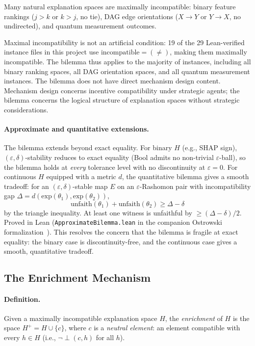 \documentclass[11pt,a4paper]{article}
\newcommand{\incomp}{\perp}
\begin{document}
Many natural explanation spaces are maximally incompatible: binary
feature rankings ($j > k$ or $k > j$, no tie), DAG edge orientations
($X \to Y$ or $Y \to X$, no undirected), and quantum measurement
outcomes.

Maximal incompatibility is not an artificial condition: 19 of the 29 Lean-verified instance files in this project use $\mathrm{incompatible} = (\neq)$, making them maximally incompatible.  The bilemma thus applies to the majority of instances, including all binary ranking spaces, all DAG orientation spaces, and all quantum measurement instances.
The bilemma does not have direct mechanism design content.  Mechanism design concerns incentive compatibility under strategic agents; the bilemma concerns the logical structure of explanation spaces without strategic considerations.

\paragraph{Approximate and quantitative extensions.}
The bilemma extends beyond exact equality. For binary $H$ (e.g., SHAP sign), $(\varepsilon, \delta)$-stability reduces to exact equality (Bool admits no non-trivial $\varepsilon$-ball), so the bilemma holds at \emph{every} tolerance level with no discontinuity at $\varepsilon = 0$. For continuous $H$ equipped with a metric $d$, the quantitative bilemma gives a smooth tradeoff: for an $(\varepsilon, \delta)$-stable map $E$ on an $\varepsilon$-Rashomon pair with incompatibility gap $\Delta = d(\text{exp}(\theta_1), \text{exp}(\theta_2))$,
$$\text{unfaith}(\theta_1) + \text{unfaith}(\theta_2) \geq \Delta - \delta$$
by the triangle inequality. At least one witness is unfaithful by $\geq (\Delta - \delta)/2$. Proved in Lean (\texttt{ApproximateBilemma.lean} in the companion Ostrowski formalization~\citep{caraker2026ostrowski}). This resolves the concern that the bilemma is fragile at exact equality: the binary case is discontinuity-free, and the continuous case gives a smooth, quantitative tradeoff.

\subsection{The Enrichment Mechanism}
\label{sec:enrichment}

\paragraph{Definition.}
Given a maximally incompatible explanation space $H$, the \emph{enrichment} of $H$ is the space $H^+ = H \cup \{c\}$, where $c$ is a \emph{neutral element}: an element compatible with every $h \in H$ (i.e., $\lnot\incomp(c, h)$ for all $h$).
\end{document}
